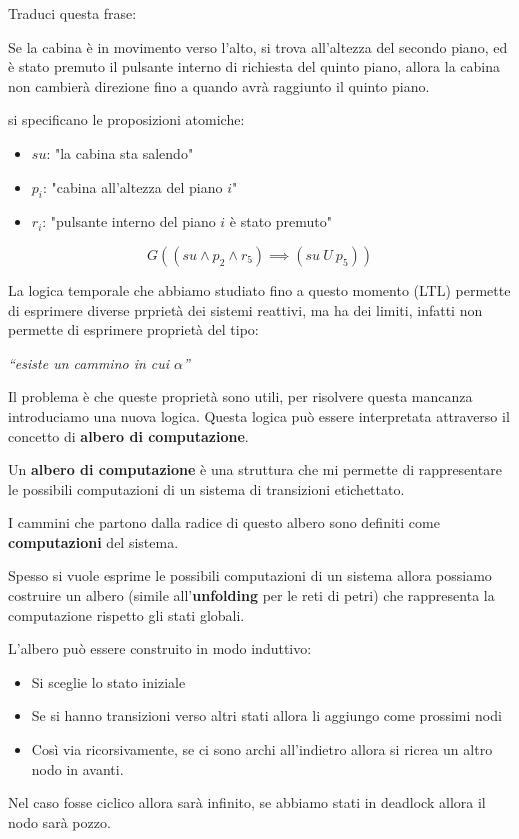 \begin{esempio}
    Traduci questa frase:
    \begin{center}
        Se la cabina è in movimento verso l'alto, si trova all'altezza del secondo
        piano, ed è stato premuto il pulsante interno di richiesta del quinto piano,
        allora la cabina non cambierà direzione fino a quando avrà raggiunto il
        quinto piano.
    \end{center}
    si specificano le proposizioni atomiche:
    \begin{itemize}
        \item $su$: "la cabina sta salendo"
        \item $p_i$: "cabina all'altezza del piano $i$"
        \item $r_i$: "pulsante interno del piano $i$ è stato premuto"
    \end{itemize}

    \begin{equation}
        G((su \land p_2 \land r_5)\implies(su \ U \ p_5))
    \end{equation}
\end{esempio}
La logica temporale che abbiamo studiato fino a questo momento (LTL) permette di
esprimere diverse prprietà dei sistemi reattivi, ma ha dei limiti, infatti non
permette di esprimere proprietà del tipo:
\begin{center}
    \emph{``esiste un cammino in cui $\alpha$''}
\end{center}
Il problema è che queste proprietà sono utili, per risolvere questa mancanza
introduciamo una nuova logica. Questa logica può essere interpretata attraverso
il concetto di \textbf{albero di computazione}.
\begin{definizione}
    Un \textbf{albero di computazione} è una struttura che mi permette di
    rappresentare le possibili computazioni di un sistema di transizioni
    etichettato.

    I cammini che partono dalla radice di questo albero sono definiti come
    \textbf{computazioni} del sistema.
\end{definizione}
\begin{nota}
    Spesso si vuole esprime le possibili computazioni di un sistema allora possiamo
    costruire un albero (simile all'\textbf{unfolding} per le reti di petri) che
    rappresenta la computazione rispetto gli stati globali.

    L'albero può essere construito in modo induttivo:
    \begin{itemize}
        \item Si sceglie lo stato iniziale
        \item Se si hanno transizioni verso altri stati allora li aggiungo come
              prossimi nodi
        \item Così via ricorsivamente, se ci sono archi all'indietro allora
              si ricrea un altro nodo in avanti.
    \end{itemize}
    Nel caso fosse ciclico allora sarà infinito, se abbiamo stati in deadlock allora
    il nodo sarà pozzo.
\end{nota}
